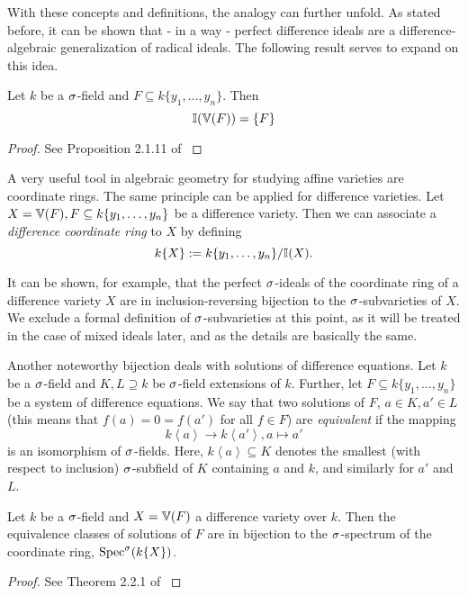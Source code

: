 With these concepts and definitions, the analogy can further unfold. As stated before, it can be shown that - in a way - perfect difference ideals are a difference-algebraic generalization of radical ideals. The following result serves to expand on this idea.

\begin{prop}
Let $k$ be a $\sigma$-field and $F \subseteq k\{y_1,\ldots,y_n\}$. Then 
$$ \mathbb{I}(\mathbb{V}(F)) = \{F\}$$
\begin{proof}
See Proposition 2.1.11 of \cite{wibmer}
\end{proof}
\end{prop}

A very useful tool in algebraic geometry for studying affine varieties are coordinate rings. The same principle can be applied for difference varieties. Let $X = \mathbb{V}(F), F \subseteq k\{y_1,\ldots,y_n\}$  be a difference variety.
Then we can associate a \emph{difference coordinate ring}  to $X$ by 
defining $$ k\{X\} := k\{y_1,\ldots,y_n\}/\mathbb{I}(X).$$


It can be shown, for example, that the perfect $\sigma$-ideals of the coordinate ring of a difference variety $X$
are in inclusion-reversing bijection to the $\sigma$-subvarieties of $X$. We exclude a formal definition of $\sigma$-subvarieties at this point, as it will be treated in the case of mixed ideals later, and as the details are basically the same.


Another noteworthy bijection deals with solutions of difference equations.
Let $k$ be a $\sigma$-field and $K,L \supseteq k$ be $\sigma$-field extensions of $k$. Further, let $F \subseteq k\{y_1,\ldots,y_n\}$ be a system of difference equations. We say that two solutions of $F$, $a \in K, a' \in L$ (this means that $f(a) = 0 = f(a')$ for all $f \in F$) are \emph{equivalent} if the mapping $$k\left<a\right> \rightarrow k\left<a'\right>, a \mapsto a'$$ is an isomorphism of $\sigma$-fields. Here, $k\left< a \right> \subseteq K$ denotes the smallest (with respect to inclusion) $\sigma$-subfield of $K$ containing $a$ and $k$, and similarly for $a'$ and $L$.

\begin{prop}
Let $k$ be a $\sigma$-field and $X = \mathbb{V}(F)$ a difference variety over $k$. Then the equivalence classes of solutions of $F$
are in bijection to the $\sigma$-spectrum of the coordinate ring, $\operatorname{Spec}^\sigma(k\{X\})$.
\begin{proof} See Theorem 2.2.1 of \cite{wibmer}
\end{proof}
\end{prop}

